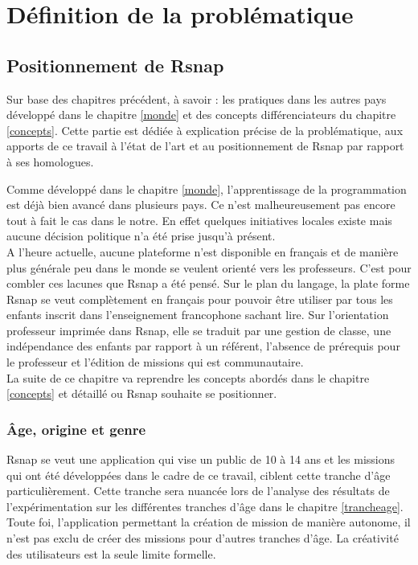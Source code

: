 \section{Définition de la problématique}
\subsection{Positionnement de Rsnap}
Sur base des chapitres précédent, à savoir : les pratiques dans les autres pays développé dans le chapitre \ref{monde} et des concepts différenciateurs du chapitre \ref{concepts}. Cette partie est dédiée à explication précise de la problématique, aux apports de ce travail à l'état de l'art et au positionnement de Rsnap par rapport à ses homologues.

Comme développé dans le chapitre \ref{monde}, l'apprentissage de la programmation est déjà bien avancé dans plusieurs pays. Ce n'est malheureusement pas encore tout à fait le cas dans le notre. En effet quelques initiatives locales existe mais aucune décision politique n'a été prise jusqu'à présent.\\

A l'heure actuelle, aucune plateforme n'est disponible en français et de manière plus générale peu dans le monde se veulent orienté vers les professeurs. C'est pour combler ces lacunes que Rsnap a été pensé. Sur le plan du langage, la plate forme Rsnap se veut complètement en français pour pouvoir être utiliser par tous les enfants inscrit dans l'enseignement francophone sachant lire. Sur l'orientation professeur imprimée dans Rsnap, elle se traduit par une gestion de classe, une indépendance des enfants par rapport à un référent, l'absence de prérequis pour le professeur et l'édition de missions qui est communautaire.\\

La suite de ce chapitre va reprendre les concepts abordés dans le chapitre \ref{concepts} et détaillé ou Rsnap souhaite se positionner.

\subsubsection{Âge, origine et genre} 
Rsnap se veut une application qui vise un public de 10 à 14 ans et les missions qui ont été développées dans le cadre de ce travail, ciblent cette tranche d'âge particulièrement. Cette tranche sera nuancée lors de l'analyse des résultats de l'expérimentation sur les différentes tranches d'âge dans le chapitre \ref{trancheage}. %
Toute foi, l'application permettant la création de mission de manière autonome, il n'est pas exclu de créer des missions pour d'autres tranches d'âge. La créativité des utilisateurs est la seule limite formelle.\\

